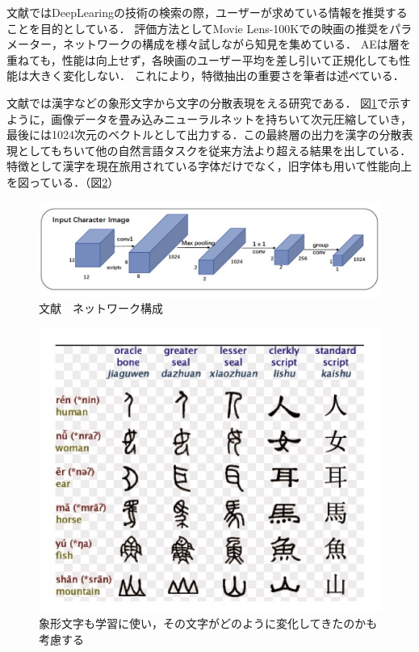 \documentclass[a4j,11pt,report]{jsbook}
\begin{document}
文献\cite{kannrenn5}ではDeepLearingの技術の検索の際，ユーザーが求めている情報を推奨することを目的としている．
評価方法としてMovie Lens-100Kでの映画の推奨をパラメーター，ネットワークの構成を様々試しながら知見を集めている．
AEは層を重ねても，性能は向上せず，各映画のユーザー平均を差し引いて正規化しても性能は大きく変化しない．
これにより，特徴抽出の重要さを筆者は述べている．

文献\cite{glyce}では漢字などの象形文字から文字の分散表現をえる研究である．
図\ref{fig:kannji1}で示すように，画像データを畳み込みニューラルネットを持ちいて次元圧縮していき，
最後には1024次元のベクトルとして出力する．この最終層の出力を漢字の分散表現としてもちいて他の自然言語タスクを従来方法より超える結果を出している．特徴として漢字を現在旅用されている字体だけでなく，旧字体も用いて性能向上を図っている．（図\ref{fig:kannji2}）




\begin{center}
  \begin{figure}[H]
    \centering
    \includegraphics[width=\linewidth]{image/kannji1.jpeg}
    \caption{文献\cite{glyce}　ネットワーク構成}
    \label{fig:kannji1}
  \end{figure}
\end{center}



\begin{center}
  \begin{figure}[H]
    \centering
    \includegraphics[width=\linewidth]{image/kannji2.jpeg}
    \caption{象形文字も学習に使い，その文字がどのように変化してきたのかも考慮する}
    \label{fig:kannji2}
  \end{figure}
\end{center}
\end{document}
